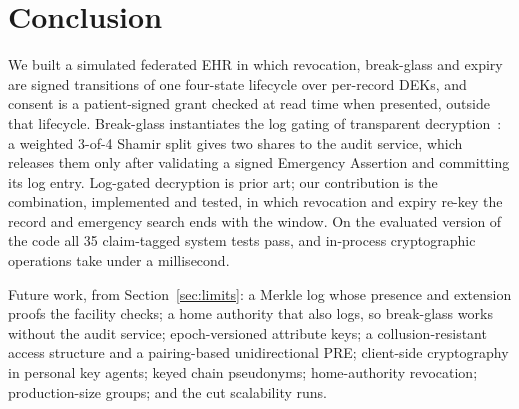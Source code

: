 \section{Conclusion}\label{sec:conclusion}

We built a simulated federated EHR in which revocation, break-glass and
expiry are signed transitions of one four-state lifecycle over per-record
DEKs, and consent is a patient-signed grant checked at read time when
presented, outside that lifecycle. %
Break-glass instantiates the log gating of transparent
decryption~\cite{ryan2017accountable,cheval2023transparency}: a weighted
3-of-4 Shamir split gives two shares to the audit service, which releases
them only after validating a signed Emergency Assertion and committing its
log entry. %
Log-gated decryption is prior art; our contribution is the
combination, implemented and tested, in which revocation and expiry re-key
the record and emergency search ends with the window. %
On the evaluated version of the code all 35 claim-tagged system tests pass, and in-process
cryptographic operations take under a millisecond. %

Future work, from Section~\ref{sec:limits}: a Merkle log whose
presence and extension proofs the facility checks; a home authority that
also logs, so break-glass works without the audit service; epoch-versioned
attribute keys; a collusion-resistant access structure and a pairing-based
unidirectional PRE;
client-side cryptography in personal key agents; keyed chain
pseudonyms; home-authority revocation; production-size groups; and the
cut scalability runs. %
